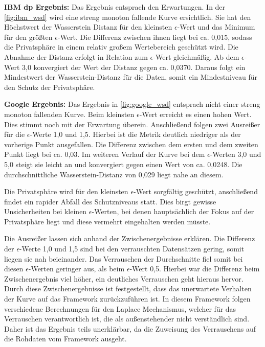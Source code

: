 \textbf{IBM \gls{dp} Ergebnis:}
Das Ergebnis entsprach den Erwartungen. In der \cref{fig:ibm_wsd} wird eine streng monoton fallende Kurve ersichtlich. Sie hat den Höchstwert der Wasserstein Distanz für den kleinsten $\epsilon$-Wert und das Minimum für den größten $\epsilon$-Wert. Die Differenz zwischen ihnen liegt bei ca. 0,015, sodass die Privatsphäre in einem relativ großem Wertebereich geschützt wird. Die Abnahme der Distanz erfolgt in Relation zum $\epsilon$-Wert gleichmäßig. Ab dem $\epsilon$-Wert 3,0 konvergiert der Wert der Distanz gegen ca. 0,0370. Daraus folgt ein Mindestwert der Wasserstein-Distanz für die Daten, somit ein Mindestniveau für den Schutz der Privatsphäre.

\textbf{Google Ergebnis:}
Das Ergebnis in \cref{fig:google_wsd} entsprach nicht einer streng monoton fallenden Kurve. Beim kleinsten $\epsilon$-Wert erreicht es einen hohen Wert. Dies stimmt noch mit der Erwartung überein. Anschließend folgen zwei Ausreißer für die $\epsilon$-Werte 1,0 und 1,5. Hierbei ist die Metrik deutlich niedriger als der vorherige Punkt ausgefallen. Die Differenz zwischen dem ersten und dem zweiten Punkt liegt bei ca. 0,03. Im weiteren Verlauf der Kurve bei dem $\epsilon$-Werten 3,0 und 5,0 steigt sie leicht an und konvergiert gegen einen Wert von ca. 0,0248. Die durchschnittliche Wasserstein-Distanz von 0,029 liegt nahe an diesem.

Die Privatsphäre wird für den kleinsten $\epsilon$-Wert sorgfältig geschützt, anschließend findet ein rapider Abfall des Schutzniveaus statt. Dies birgt gewisse Unsicherheiten bei kleinen $\epsilon$-Werten, bei denen hauptsächlich der Fokus auf der Privatsphäre liegt und diese vermehrt eingehalten werden müsste.

Die Ausreißer lassen sich anhand der Zwischenergebnisse erklären. Die Differenz der $\epsilon$-Werte 1,0 und 1,5 sind bei den verrauschten Datensätzen gering, somit liegen sie nah beieinander. Das Verrauschen der Durchschnitte fiel somit bei diesen $\epsilon$-Werten geringer aus, als beim $\epsilon$-Wert 0,5. Hierbei war die Differenz beim Zwischenergebnis viel höher, ein deutliches Verrauschen geht hieraus hervor. Durch diese Zwischenergebnisse ist festgestellt, dass das unerwartete Verhalten der Kurve auf das Framework zurückzuführen ist. 
In diesem Framework folgen verschiedene Berechnungen für den Laplace Mechanismus, welcher für das Verrauschen verantwortlich ist, die als außenstehender nicht verständlich sind. Daher ist das Ergebnis teils unerklärbar, da die Zuweisung des Verrauschens auf die Rohdaten vom Framework ausgeht.

